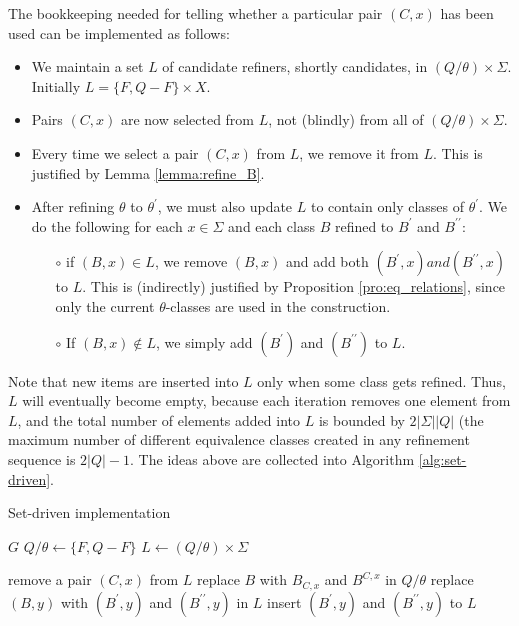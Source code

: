 The bookkeeping needed for telling whether a particular pair $(C,x)$ has been used can be implemented as follows:
\begin{itemize}
	\item We maintain a set $L$ of candidate refiners, shortly candidates, in $(Q/\theta)\times\Sigma$. Initially $L=\{F,Q-F\}\times X$.
	\item Pairs $(C,x)$ are now selected from $L$, not (blindly) from all of $(Q/\theta)\times\Sigma$.
	\item Every time we select a pair $(C,x)$ from $L$, we remove it from $L$. This is justified by Lemma \ref{lemma:refine_B}.
	\item After refining $\theta$ to $\theta^\prime$, we must also update $L$ to contain only classes of $\theta^\prime$. We do the following for each $x\in\Sigma$ and each class $B$ refined to $B^\prime$ and $B^{\prime\prime}$:
	\begin{itemize}
		\item[$\circ$] if $(B,x)\in L$, we remove $(B,x)$ and add both $(B^\prime,x) and (B^{\prime\prime},x)$ to $L$. This is (indirectly) justified by Proposition \ref{pro:eq_relations}, since only the current $\theta$-classes are used in the construction.	
		\item[$\circ$] If $(B,x)\notin L$, we simply add $(B^\prime)$ and $(B^{\prime\prime})$ to $L$.
	\end{itemize}
\end{itemize}

Note that new items are inserted into $L$ only when some class gets refined. Thus, $L$ will eventually become empty, because each iteration removes one element from $L$, and the total number of elements added into $L$ is bounded by $2|\Sigma||Q|$ (the maximum number of different equivalence classes created in any refinement sequence is $2|Q|-1$. The ideas above are collected into Algorithm \ref{alg:set-driven}.

\begin{algorithm}  
	\caption{Set-driven implementation}  \label{alg:set-driven}
	\begin{algorithmic}[1] %
		 {$G$}
		\State $Q/\theta\gets \{F,Q-F\}$
		\State $L\gets (Q/\theta)\times\Sigma$
		
		\State remove a pair $(C,x)$ from $L$
			\State replace $B$ with $B_{C,x}$ and $B^{C,x}$ in  $Q/\theta$
					\State replace $(B,y)$ with $(B^\prime,y)$ and $(B^{\prime\prime},y)$ in $L$
				\Else
					\State insert $(B^\prime,y)$ and $(B^{\prime\prime},y)$ to $L$
				\EndIf
			\EndFor
		\EndFor
		\EndWhile
		
		\State \Return{$\theta$}  
		\EndFunction 
	\end{algorithmic}
\end{algorithm}


